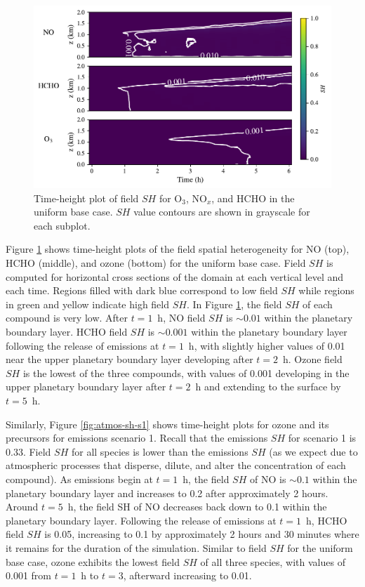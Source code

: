 \begin{figure}[!t]
    \centering
    \includegraphics[width=.97\textwidth]{figures/chapter4/height-time-nsh-multivar-uniform-basecase.pdf}
    \caption{Time-height plot of field $SH$ for O$_3$, NO$_x$, and HCHO in the uniform base case. $SH$ value contours are shown in grayscale for each subplot.}
    \label{fig:atmos-sh-ub}
  \end{figure}

Figure \ref{fig:atmos-sh-ub} shows time-height plots of the field spatial heterogeneity for NO (top), HCHO (middle), and ozone (bottom) for the uniform base case. Field $SH$ is computed for horizontal cross sections of the domain at each vertical level and each time. Regions filled with dark blue correspond to low field $SH$ while regions in green and yellow indicate high field $SH$. In Figure \ref{fig:atmos-sh-ub}, the field $SH$ of each compound is very low. After $t=1$~h, NO field $SH$ is $\sim0.01$ within the planetary boundary layer. HCHO field $SH$ is $\sim0.001$ within the planetary boundary layer following the release of emissions at $t=1$~h, with slightly higher values of 0.01 near the upper planetary boundary layer developing after $t=2$~h. Ozone field $SH$ is the lowest of the three compounds, with values of 0.001 developing in the upper planetary boundary layer after $t=2$~h and extending to the surface by $t=5$~h.

Similarly, Figure \ref{fig:atmos-sh-s1} shows time-height plots for ozone and its precursors for emissions scenario 1. Recall that the emissions $SH$ for scenario 1 is 0.33. Field $SH$ for all species is lower than the emissions $SH$ (as we expect due to atmospheric processes that disperse, dilute, and alter the concentration of each compound). As emissions begin at $t=1$~h, the field $SH$ of NO is $\sim0.1$ within the planetary boundary layer and increases to 0.2 after approximately 2 hours. Around $t=5$~h, the field SH of NO decreases back down to 0.1 within the planetary boundary layer. Following the release of emissions at $t=1$~h, HCHO field $SH$ is 0.05, increasing to 0.1 by approximately 2 hours and 30 minutes where it remains for the duration of the simulation. Similar to field $SH$ for the uniform base case, ozone exhibits the lowest field $SH$ of all three species, with values of 0.001 from $t=1$~h to $t=3$, afterward increasing to 0.01.

